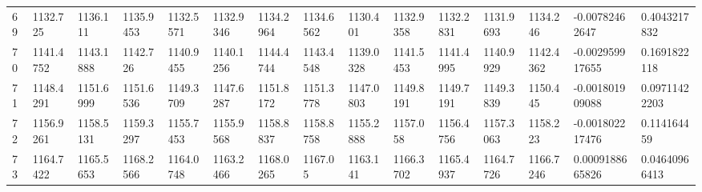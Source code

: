 \begin{landscape}
{\begin{longtable}{@{}lllllllllllllll@{}}
		69                                           & 1132.725                 & 1136.111                 & 1135.9453                & 1132.5571                & 1132.9346                & 1134.2964                & 1134.6562                & 1130.401                 & 1132.9358                & 1132.2831                & 1131.9693                & 1134.246                 & -0.00782462647                                                         & 0.4043217832                                    \\
		70                                           & 1141.4752                & 1143.1888                & 1142.726                 & 1140.9455                & 1140.1256                & 1144.4744                & 1143.4548                & 1139.0328                & 1141.5453                & 1141.4995                & 1140.9929                & 1142.4362                & -0.002959917655                                                        & 0.1691822118                                    \\
		71                                           & 1148.4291                & 1151.6999                & 1151.6536                & 1149.3709                & 1147.6287                & 1151.8172                & 1151.3778                & 1147.0803                & 1149.8191                & 1149.7191                & 1149.3839                & 1150.445                 & -0.001801909088                                                        & 0.09711422203                                   \\
		72                                           & 1156.9261                & 1158.5131                & 1159.3297                & 1155.7453                & 1155.9568                & 1158.8837                & 1158.8758                & 1155.2888                & 1157.058                 & 1156.4756                & 1157.3063                & 1158.223                 & -0.001802217476                                                        & 0.114164459                                     \\
		73                                           & 1164.7422                & 1165.5653                & 1168.2566                & 1164.0748                & 1163.2466                & 1168.0265                & 1167.05                  & 1163.141                 & 1166.3702                & 1165.4937                & 1164.7726                & 1166.7246                & 0.0009188665826                                                        & 0.04640966413                                   \\

\end{longtable}}
\end{landscape}

